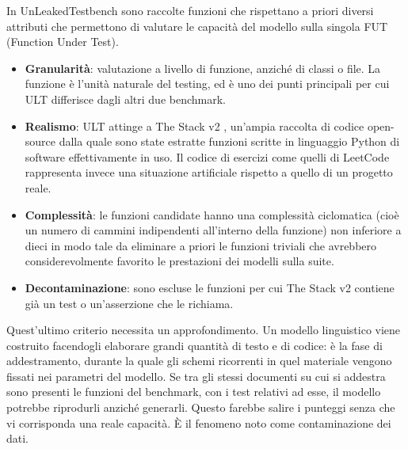 In UnLeakedTestbench \cite{huang2025ult} sono raccolte funzioni che rispettano a priori diversi attributi che permettono di valutare le capacità del modello sulla singola FUT (Function Under Test). 

\begin{itemize}
  \item \textbf{Granularità}: valutazione a livello di funzione, anziché di classi o file. La funzione è l'unità naturale del testing, ed è uno dei punti principali per cui ULT differisce dagli altri due benchmark.
  \item \textbf{Realismo}: ULT attinge a The Stack v2 \cite{lozhkov2024stackv2}, un'ampia raccolta di codice open-source dalla quale sono state estratte funzioni scritte in linguaggio Python di software effettivamente in uso. Il codice di esercizi come quelli di LeetCode rappresenta invece una situazione artificiale rispetto a quello di un progetto reale.
  \item \textbf{Complessità}: le funzioni candidate hanno una complessità ciclomatica \cite{mccabe1976complexity} (cioè un numero di cammini indipendenti all'interno della funzione) non inferiore a dieci in modo tale da eliminare a priori le funzioni triviali che avrebbero considerevolmente favorito le prestazioni dei modelli sulla suite.
  \item \textbf{Decontaminazione}: sono escluse le funzioni per cui The Stack v2 contiene già un test o un'asserzione che le richiama.
\end{itemize} 
Quest'ultimo criterio necessita un approfondimento. Un modello linguistico viene costruito facendogli elaborare grandi quantità di testo e di codice: è la fase di addestramento, durante la quale gli schemi ricorrenti in quel materiale vengono fissati nei parametri del modello. Se tra gli stessi documenti su cui si addestra sono presenti le funzioni del benchmark, con i test relativi ad esse, il modello potrebbe riprodurli anziché generarli. Questo farebbe salire i punteggi senza che vi corrisponda una reale capacità. È il fenomeno noto come contaminazione dei dati.

